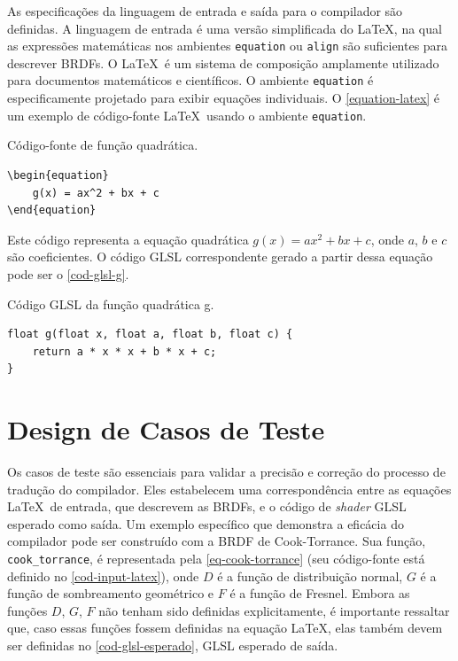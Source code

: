 \documentclass[english, 
               brazil, 
               bsc] %
               {dcomp-abntex2}
\begin{document}
As especificações da linguagem de entrada e saída para o compilador são definidas. A linguagem de entrada é uma versão simplificada do \LaTeX, na qual as expressões matemáticas nos ambientes \texttt{equation} ou \texttt{align} são suficientes para descrever BRDFs. O \LaTeX\  é um sistema de composição amplamente utilizado para documentos matemáticos e científicos. O ambiente \texttt{equation} é especificamente projetado para exibir equações individuais. O \autoref{equation-latex} é um exemplo de código-fonte \LaTeX\  usando o ambiente \texttt{equation}.


\begin{codigo}[H]
\caption{\small Código-fonte de função quadrática.}
\label{equation-latex}
\begin{lstlisting}
\begin{equation}
    g(x) = ax^2 + bx + c
\end{equation}
\end{lstlisting}
\end{codigo}




Este código representa a equação quadrática \( g(x) = ax^2 + bx + c \), onde \( a \), \( b \) e \( c \) são coeficientes. O código GLSL correspondente gerado a partir dessa equação pode ser o \autoref{cod-glsl-g}.  

\begin{codigo}[H]
\caption{\small Código GLSL da função quadrática g.}
\label{cod-glsl-g}
\begin{lstlisting}
float g(float x, float a, float b, float c) {
    return a * x * x + b * x + c;
}
\end{lstlisting}
\end{codigo}


\section{Design de Casos de Teste} \label{testes}


Os casos de teste são essenciais para validar a precisão e correção do processo de tradução do compilador. Eles estabelecem uma correspondência entre as equações \LaTeX\ de entrada, que descrevem as BRDFs, e o código de \textit{shader} GLSL esperado como saída. Um exemplo específico que demonstra a eficácia do compilador pode ser construído com a BRDF de Cook-Torrance. Sua função, \texttt{cook\_torrance}, é representada pela \autoref{eq-cook-torrance} (seu código-fonte está definido no \autoref{cod-input-latex}), onde \(D\) é a função de distribuição normal, \(G\) é a função de sombreamento geométrico e \(F\) é a função de Fresnel. Embora as funções \(D\), \(G\), \(F\) não tenham sido definidas explicitamente, é importante ressaltar que, caso essas funções fossem definidas na equação \LaTeX, elas também devem ser definidas no \autoref{cod-glsl-esperado}, GLSL esperado de saída.  
\end{document}
